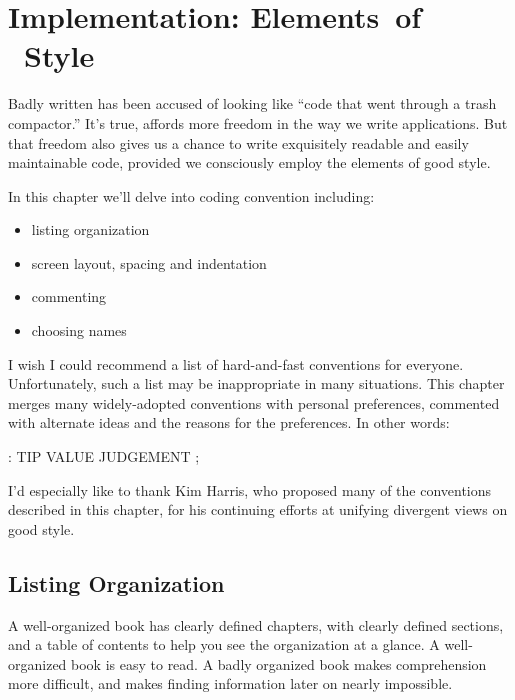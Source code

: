 
\chapter{Implementation: Elements~of \Forth{}~Style}%
%

Badly written \Forth{} has been accused of looking like ``code that
went through a trash compactor.'' It's true, \Forth{} affords more
freedom in the way we write applications.  But that freedom also gives
us a chance to write exquisitely readable and easily maintainable
code, provided we consciously employ the elements of good \Forth{}
style.

In this chapter we'll delve into \Forth{} coding convention
including:

\begin{itemize}%
\item listing organization
\item screen layout, spacing and indentation
\item commenting
\item choosing names
\end{itemize}
I wish I could recommend a list of hard-and-fast conventions for
everyone.  Unfortunately, such a list may be inappropriate in many
situations.  This chapter merges many widely-adopted conventions with
personal preferences, commented with alternate ideas and the reasons
for the preferences.  In other words:
\begin{Code}
: TIP  VALUE JUDGEMENT ;
\end{Code}
I'd especially like to thank Kim Harris, who
proposed many of the conventions described in this chapter, for his
continuing efforts at unifying divergent views on good \Forth{} style.

\section{Listing Organization}%
%

A well-organized book has clearly defined chapters, with clearly defined
sections, and a table of contents to help you see the organization at a
glance.  A well-organized book is easy to read.  A badly organized book
makes comprehension more difficult, and makes finding information
later on nearly impossible.

